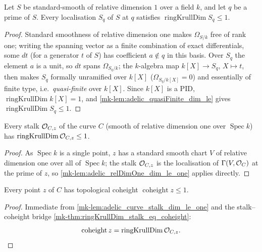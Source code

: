 \begin{lemma}
  \label{mk-lem:adelic_relDimOne_dim_le_one}
  \leanok
  Let \(S\) be standard-smooth of relative dimension \(1\) over a field
  \(k\), and let \(q\) be a prime of \(S\). Every localisation \(S_q\)
  of \(S\) at \(q\) satisfies \(\operatorname{ringKrullDim} S_q \le 1\).
\end{lemma}
\begin{proof}
  \leanok
  Standard smoothness of relative dimension one makes \(\Omega_{S/k}\)
  free of rank one; writing the spanning vector as a finite combination
  of exact differentials, some \(dt\) (for a generator \(t\) of \(S\))
  has coefficient \(a \notin q\) in this basis. Over \(S_q\) the element
  \(a\) is a unit, so \(dt\) spans \(\Omega_{S_q/k}\); the \(k\)-algebra
  map \(k[X] \to S_q\), \(X \mapsto t\), then makes \(S_q\) formally
  unramified over \(k[X]\) (\(\Omega_{S_q/k[X]} = 0\)) and essentially
  of finite type, i.e.\ \emph{quasi-finite} over \(k[X]\). Since
  \(k[X]\) is a PID, \(\operatorname{ringKrullDim} k[X] = 1\), and
  \ref{mk-lem:adelic_quasiFinite_dim_le} gives
  \(\operatorname{ringKrullDim} S_q \le 1\).
\end{proof}

\begin{lemma}
  \label{mk-lem:adelic_curve_stalk_dim_le_one}
  \leanok
  Every stalk \(\mathcal{O}_{C, z}\) of the curve \(C\) (smooth of relative
  dimension one over \(\operatorname{Spec} k\)) has
  \(\operatorname{ringKrullDim} \mathcal{O}_{C, z} \le 1\).
\end{lemma}
\begin{proof}
  \leanok
  As \(\operatorname{Spec} k\) is a single point, \(z\) has a standard
  smooth chart \(V\) of relative dimension one over all of
  \(\operatorname{Spec} k\); the stalk \(\mathcal{O}_{C, z}\) is the
  localisation of \(\Gamma(V, \mathcal{O}_{C})\) at the prime of \(z\), so
  \ref{mk-lem:adelic_relDimOne_dim_le_one} applies directly.
\end{proof}

\begin{lemma}
  \label{mk-lem:adelic_curve_coheight_le_one}
  \leanok
  Every point \(z\) of \(C\) has topological coheight
  \(\operatorname{coheight} z \le 1\).
\end{lemma}
\begin{proof}
  \leanok
  Immediate from \ref{mk-lem:adelic_curve_stalk_dim_le_one} and the
  stalk--coheight bridge \ref{mk-thm:ringKrullDim_stalk_eq_coheight}:
  \[
    \operatorname{coheight}z
      =\operatorname{ringKrullDim}\mathcal{O}_{C,z}.
  \]
\end{proof}

